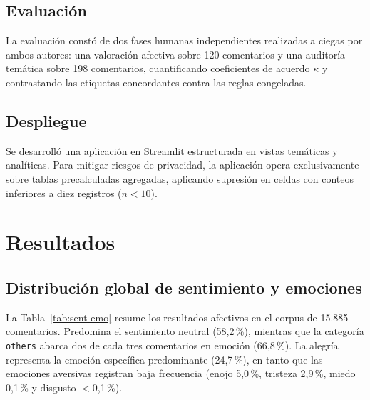 \documentclass[conference]{IEEEtran}
\newcommand{\pc}{\,\%}
\begin{document}
\subsection{Evaluaci\'on}
La evaluaci\'on const\'o de dos fases humanas independientes realizadas a ciegas por ambos autores: una valoraci\'on afectiva sobre 120 comentarios y una auditor\'ia tem\'atica sobre 198 comentarios, cuantificando coeficientes de acuerdo $\kappa$ y contrastando las etiquetas concordantes contra las reglas congeladas.

\subsection{Despliegue}
Se desarroll\'o una aplicaci\'on en Streamlit estructurada en vistas tem\'aticas y anal\'iticas. Para mitigar riesgos de privacidad, la aplicaci\'on opera exclusivamente sobre tablas precalculadas agregadas, aplicando supresi\'on en celdas con conteos inferiores a diez registros ($n < 10$).

\section{Resultados}

\subsection{Distribuci\'on global de sentimiento y emociones}
La Tabla~\ref{tab:sent-emo} resume los resultados afectivos en el corpus de 15.885 comentarios. Predomina el sentimiento neutral (58,2\pc), mientras que la categor\'ia \texttt{others} abarca dos de cada tres comentarios en emoci\'on (66,8\pc). La alegr\'ia representa la emoci\'on espec\'ifica predominante (24,7\pc), en tanto que las emociones aversivas registran baja frecuencia (enojo 5,0\pc, tristeza 2,9\pc, miedo 0,1\pc{} y disgusto $<$0,1\pc).
\end{document}
